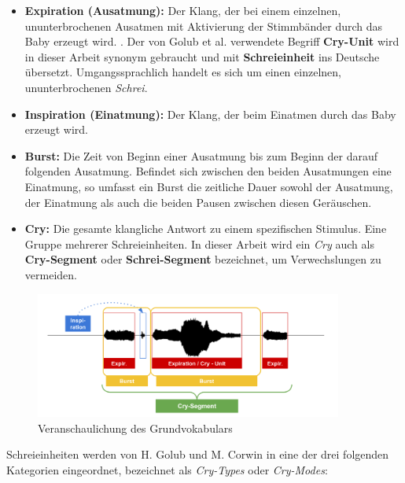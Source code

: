 \begin{itemize}
	\item \textbf{Expiration (Ausatmung):} Der Klang, der bei einem einzelnen, ununterbrochenen Ausatmen mit Aktivierung der Stimmbänder durch das Baby erzeugt wird. \cite{rythmic}. Der von Golub et al. \cite[S. 61]{cryModel} verwendete Begriff \textbf{Cry-Unit} wird in dieser Arbeit synonym gebraucht und mit \textbf{Schreieinheit} ins Deutsche übersetzt. Umgangssprachlich handelt es sich um einen einzelnen, ununterbrochenen \emph{Schrei}.
	\item \textbf{Inspiration (Einatmung):} Der Klang, der beim Einatmen durch das Baby erzeugt wird.
	\item  \textbf{Burst:} Die Zeit von Beginn einer Ausatmung bis zum Beginn der darauf folgenden Ausatmung. Befindet sich zwischen den beiden Ausatmungen eine Einatmung, so umfasst ein Burst die zeitliche Dauer sowohl der Ausatmung, der Einatmung als auch die beiden Pausen zwischen diesen Geräuschen.\cite{rythmic}
	\item  \textbf{Cry:} Die gesamte klangliche Antwort zu einem spezifischen Stimulus. Eine Gruppe mehrerer Schreieinheiten.\cite[S. 61]{cryModel} In dieser Arbeit wird ein \emph{Cry} auch als \textbf{Cry-Segment} oder \textbf{Schrei-Segment} bezeichnet, um Verwechslungen zu vermeiden.
\end{itemize}

\begin{figure}[H]
	\centering
	\includegraphics[width=0.9\textwidth]{bilder/cryVoc02.png}
	\caption{Veranschaulichung des Grundvokabulars}
	\label{img:cryVocabulary}
\end{figure}

Schreieinheiten werden von H. Golub und M. Corwin in eine der drei folgenden Kategorien eingeordnet, bezeichnet als \emph{Cry-Types} oder \emph{Cry-Modes}:

